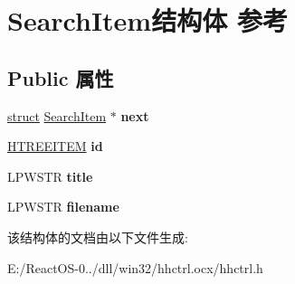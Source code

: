 \hypertarget{struct_search_item}{}\section{Search\+Item结构体 参考}
\label{struct_search_item}
\subsection*{Public 属性}
\begin{DoxyCompactItemize}
\item 
\mbox{\label{struct_search_item_afb4c8f483055b83730b5826927ae4906}} 
\hyperlink{interfacestruct}{struct} \hyperlink{struct_search_item}{Search\+Item} $\ast$ {\bfseries next}
\item 
\mbox{\label{struct_search_item_a4fa3cdd74381a3b9bcafa40991419e50}} 
\hyperlink{struct___t_r_e_e_i_t_e_m}{H\+T\+R\+E\+E\+I\+T\+EM} {\bfseries id}
\item 
\mbox{\label{struct_search_item_a509bae2dd906fa6be7748857a085c4e0}} 
L\+P\+W\+S\+TR {\bfseries title}
\item 
\mbox{\label{struct_search_item_a3541b267d9178a43cf4ce418c42d5e5a}} 
L\+P\+W\+S\+TR {\bfseries filename}
\end{DoxyCompactItemize}


该结构体的文档由以下文件生成\+:\begin{DoxyCompactItemize}
\item 
E\+:/\+React\+O\+S-\/0../dll/win32/hhctrl.\+ocx/hhctrl.\+h\end{DoxyCompactItemize}
